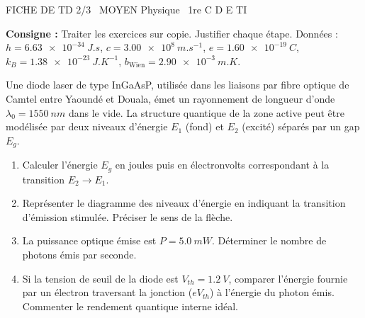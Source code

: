 \documentclass[11pt]{article}
\begin{document}
\begin{tcolorbox}[enhanced,colback=popink,colframe=popink,arc=10pt,boxrule=0pt,left=12pt,right=12pt,top=9pt,bottom=9pt]
{\color{white}\popxbold\small FICHE DE TD 2/3 \textbullet\ MOYEN \hfill Physique \textbullet\ 1re C D E TI\par}
\end{tcolorbox}
\vspace{4pt}
\noindent \textbf{Consigne :} Traiter les exercices sur copie. Justifier chaque étape. Données : $h = \SI{6,63e-34}{J.s}$, $c = \SI{3,00e8}{m.s^{-1}}$, $e = \SI{1,60e-19}{C}$, $k_B = \SI{1,38e-23}{J.K^{-1}}$, $b_{\text{Wien}} = \SI{2,90e-3}{m.K}$.

\begin{exercice}
Une diode laser de type InGaAsP, utilisée dans les liaisons par fibre optique de Camtel entre Yaoundé et Douala, émet un rayonnement de longueur d'onde $\lambda_0 = \SI{1550}{nm}$ dans le vide. La structure quantique de la zone active peut être modélisée par deux niveaux d'énergie $E_1$ (fond) et $E_2$ (excité) séparés par un gap $E_g$.
\begin{enumerate}
    \item Calculer l'énergie $E_g$ en joules puis en électronvolts correspondant à la transition $E_2 \to E_1$.
    \item Représenter le diagramme des niveaux d'énergie en indiquant la transition d'émission stimulée. Préciser le sens de la flèche.
    \item La puissance optique émise est $P = \SI{5,0}{mW}$. Déterminer le nombre de photons émis par seconde.
    \item Si la tension de seuil de la diode est $V_{th} = \SI{1,2}{V}$, comparer l'énergie fournie par un électron traversant la jonction ($e V_{th}$) à l'énergie du photon émis. Commenter le rendement quantique interne idéal.
\end{enumerate}
\end{exercice}
\end{document}
